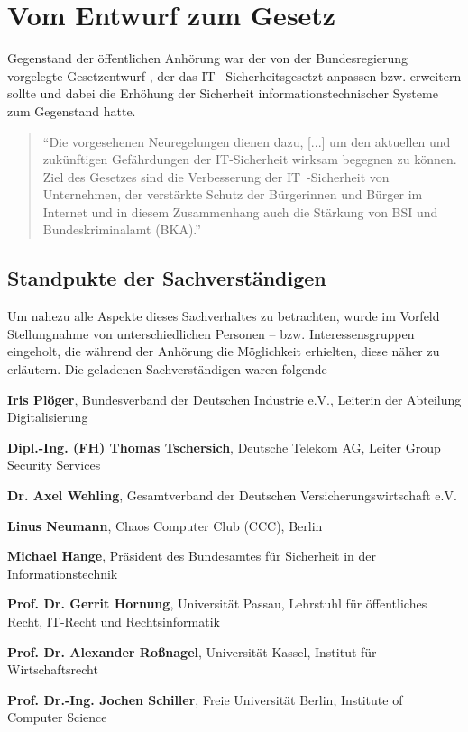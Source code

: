 \documentclass[a4paper,letterpaper,twocolumn,10pt,ngerman]{article}
\newcommand{\descitem}[1]{\textbf{#1}}	%
\begin{document}
\section{Vom Entwurf zum Gesetz}
\label{sec:EntwurfzumGesetz}
Gegenstand der öffentlichen Anhörung  war der von der Bundesregierung vorgelegte Gesetzentwurf \cite{GesEntw15}, der das IT~-Sicherheitsgesetzt anpassen bzw. erweitern sollte und dabei die Erhöhung der Sicherheit informationstechnischer Systeme zum Gegenstand hatte. 
\begin{quotation}
"`Die vorgesehenen Neuregelungen dienen dazu, [...] um  den  aktuellen  und zukünftigen  Gefährdungen  der IT-Sicherheit wirksam begegnen zu können. Ziel des Gesetzes sind die Verbesserung der IT~-Sicherheit von Unternehmen, der verstärkte Schutz der Bürgerinnen und Bürger im Internet und in diesem Zusammenhang auch die Stärkung von BSI und Bundeskriminalamt (BKA)."' \cite[S. 1]{GesEntw15} 
\end{quotation}

\subsection{Standpukte der Sachverständigen}
\label{subsec:StandpunkteSachverständige}
Um nahezu alle Aspekte dieses Sachverhaltes zu betrachten, wurde im Vorfeld Stellungnahme von unterschiedlichen Personen -- bzw. Interessensgruppen eingeholt, die während der Anhörung die Möglichkeit erhielten, diese näher zu erläutern. Die geladenen Sachverständigen waren folgende

\begin{description*}
    \item	{\descitem{Iris Plöger}}, Bundesverband der Deutschen Industrie e.V., Leiterin der Abteilung Digitalisierung
    \item	{\descitem{Dipl.-Ing.  (FH) Thomas Tschersich}}, Deutsche Telekom AG, Leiter Group Security Services
    \item	{\descitem{Dr. Axel Wehling}}, Gesamtverband der Deutschen Versicherungswirtschaft e.V.
    \item	{\descitem{Linus Neumann}}, Chaos Computer Club (CCC), Berlin

	\item	{\descitem{Michael Hange}}, Präsident des Bundesamtes für Sicherheit in der Informationstechnik
    \item	{\descitem{Prof. Dr. Gerrit Hornung}}, Universität Passau, Lehrstuhl für öffentliches Recht, IT-Recht und Rechtsinformatik
    \item	{\descitem{Prof. Dr. Alexander Roßnagel}}, Universität Kassel, Institut für Wirtschaftsrecht
    \item	{\descitem{Prof. Dr.-Ing. Jochen Schiller}}, Freie Universität Berlin, Institute of Computer Science
\end{description*}
\end{document}
